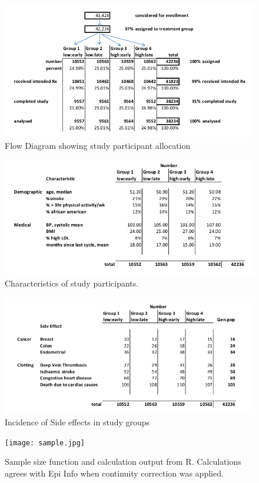 \documentclass[11pt]{article}
\begin{document}
\begin{figure}[h!]
	\centering
	\includegraphics[scale=0.5]{figure1.jpg}
	\caption{Flow Diagram showing study participant allocation}
	\label{flow}
\end{figure}

\begin{figure}[h!]
	\centering
	\includegraphics[scale=0.6]{table1.jpg}
	\caption{Characteristics of study participants.}
	\label{table1}
\end{figure}
 
\begin{figure}[h!]
	\centering
	\includegraphics[scale=0.7]{table2.jpg}
	\caption{Incidence of Side effects in study groups}
	\label{table2}
\end{figure}

\begin{figure}[h!]
	\centering
	\texttt{[image: sample.jpg]}
	\caption{Sample size function and calculation output from R. Calculations agrees with Epi Info when continuity correction was applied.}
	\label{sample}
\end{figure}

\clearpage


\end{document}
